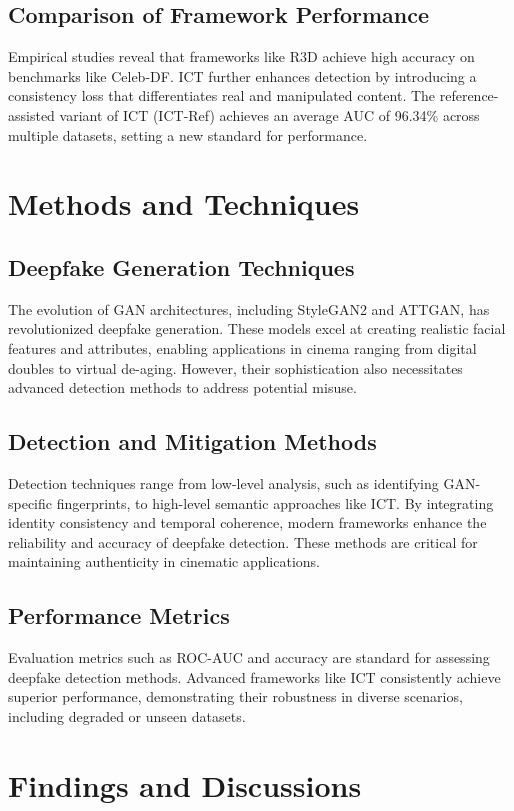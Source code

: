 \documentclass[12pt]{article}
\begin{document}
\subsection{Comparison of Framework Performance}
Empirical studies reveal that frameworks like R3D achieve high accuracy on benchmarks like Celeb-DF. ICT further enhances detection by introducing a consistency loss that differentiates real and manipulated content. The reference-assisted variant of ICT (ICT-Ref) achieves an average AUC of 96.34\% across multiple datasets, setting a new standard for performance.

\section{Methods and Techniques}
\subsection{Deepfake Generation Techniques}
The evolution of GAN architectures, including StyleGAN2 and ATTGAN, has revolutionized deepfake generation. These models excel at creating realistic facial features and attributes, enabling applications in cinema ranging from digital doubles to virtual de-aging. However, their sophistication also necessitates advanced detection methods to address potential misuse.

\subsection{Detection and Mitigation Methods}
Detection techniques range from low-level analysis, such as identifying GAN-specific fingerprints, to high-level semantic approaches like ICT. By integrating identity consistency and temporal coherence, modern frameworks enhance the reliability and accuracy of deepfake detection. These methods are critical for maintaining authenticity in cinematic applications.

\subsection{Performance Metrics}
Evaluation metrics such as ROC-AUC and accuracy are standard for assessing deepfake detection methods. Advanced frameworks like ICT consistently achieve superior performance, demonstrating their robustness in diverse scenarios, including degraded or unseen datasets.

\section{Findings and Discussions}
\end{document}
